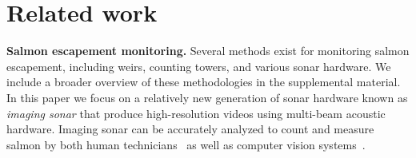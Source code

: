 
\section{Related work}
\label{sec:related}




\noindent
\textbf{Salmon escapement monitoring.} Several methods exist for monitoring salmon escapement, including weirs, counting towers, and various sonar hardware. We include a broader overview of these methodologies in the supplemental material.
In this paper we focus on a relatively new generation of sonar hardware known as \textit{imaging sonar} that produce high-resolution videos using multi-beam acoustic hardware. Imaging sonar can be accurately analyzed to count and measure salmon by both human technicians~\cite{AlaskaSonar} as well as computer vision systems~\cite{kay2022caltechfishcountingdataset}.



